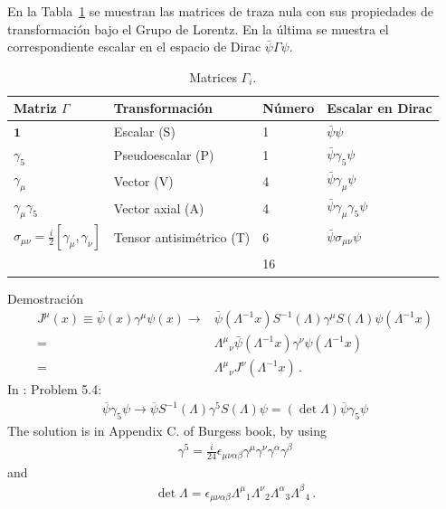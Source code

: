 En la Tabla~\ref{tab:Gamma} se muestran las matrices de traza nula con sus propiedades de transformación bajo el Grupo de Lorentz. En la última se muestra el correspondiente escalar en el espacio de Dirac $\bar\psi\Gamma\psi$.
\begin{table} %
  \centering %
  \begin{tabular}{l|l|l|l} %
Matriz $\Gamma$&Transformación&Número&Escalar en Dirac\\\hline{}
$\mathbf{1}$&Escalar (S)&1&$\bar\psi\psi$\\
$\gamma_5$&Pseudoescalar (P)&1&$\bar\psi\gamma_5\psi$\\
$\gamma_\mu$&Vector (V)&4&$\bar\psi\gamma_\mu\psi$\\
$\gamma_\mu\gamma_5$ &Vector axial (A)&4&$\bar\psi\gamma_\mu\gamma_5\psi$\\
$\sigma_{\mu\nu}=\frac{i}{2}\left[\gamma_\mu,\gamma_\nu\right]$&Tensor antisimétrico (T)&6&$\bar\psi\sigma_{\mu\nu}\psi$\\\hline{}
&&16&\\
  \end{tabular} %
  \caption{Matrices $\Gamma_i$.} %
\label{tab:Gamma} %
\end{table} %
Demostración
\begin{align}
J^\mu(x)\equiv  \bar\psi(x)\gamma^\mu\psi(x)\to&\bar\psi(\Lambda^{-1}x)S^{-1}(\Lambda)\gamma^\mu S(\Lambda)\psi(\Lambda^{-1}x) \nonumber\\
=&{\Lambda^\mu}_\nu\bar\psi(\Lambda^{-1}x) \gamma^\nu\psi(\Lambda^{-1}x) \nonumber\\
=&{\Lambda^\mu}_\nu J^\nu(\Lambda^{-1}x)\,.
\end{align}
In \cite{Gross:1993}: Problem 5.4: 
\begin{align}
  \overline{\psi}\gamma_5\psi\to\overline{\psi}S^{-1}(\Lambda)\gamma^5S(\Lambda)\psi =(\det\Lambda)\overline{\psi}\gamma_5\psi
\end{align}
The solution is in Appendix C. of Burgess book, by using
\begin{align}
  \gamma^5=\frac{i}{24}\epsilon_{\mu\nu\alpha\beta}\gamma^\mu\gamma^\nu\gamma^\alpha\gamma^\beta
\end{align}
and
\begin{align}
  \det \Lambda=\epsilon_{\mu\nu\alpha\beta}{\Lambda^\mu}_1{\Lambda^\nu}_2{\Lambda^\alpha}_3{\Lambda^\beta}_4\,.
\end{align}


